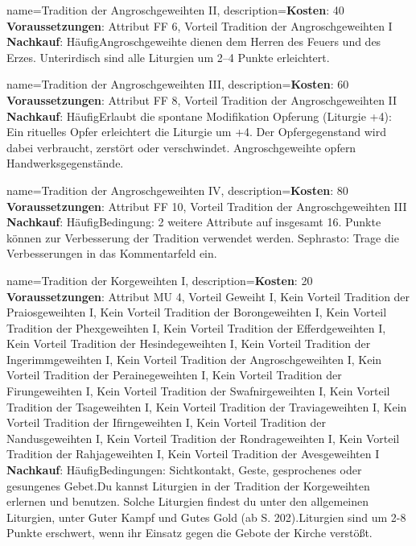 {
    name={Tradition der Angroschgeweihten II},
    description={\textbf{Kosten}: 40 \textbf{Voraussetzungen}: Attribut FF 6, Vorteil Tradition der Angroschgeweihten I \textbf{Nachkauf}: Häufig\newline Angroschgeweihte dienen dem Herren des Feuers und des Erzes. Unterirdisch sind alle Liturgien um 2–4 Punkte erleichtert.}
}


{
    name={Tradition der Angroschgeweihten III},
    description={\textbf{Kosten}: 60 \textbf{Voraussetzungen}: Attribut FF 8, Vorteil Tradition der Angroschgeweihten II \textbf{Nachkauf}: Häufig\newline Erlaubt die spontane Modifikation Opferung (Liturgie +4): Ein rituelles Opfer erleichtert die Liturgie um +4. Der Opfergegenstand wird dabei verbraucht, zerstört oder verschwindet. Angroschgeweihte opfern Handwerksgegenstände.}
}


{
    name={Tradition der Angroschgeweihten IV},
    description={\textbf{Kosten}: 80 \textbf{Voraussetzungen}: Attribut FF 10, Vorteil Tradition der Angroschgeweihten III \textbf{Nachkauf}: Häufig\newline Bedingung: 2 weitere Attribute auf insgesamt 16. Punkte können zur Verbesserung der Tradition verwendet werden. Sephrasto: Trage die Verbesserungen in das Kommentarfeld ein.}
}


{
    name={Tradition der Korgeweihten I},
    description={\textbf{Kosten}: 20 \textbf{Voraussetzungen}: Attribut MU 4, Vorteil Geweiht I, Kein Vorteil Tradition der Praiosgeweihten I, Kein Vorteil Tradition der Borongeweihten I, Kein Vorteil Tradition der Phexgeweihten I, Kein Vorteil Tradition der Efferdgeweihten I, Kein Vorteil Tradition der Hesindegeweihten I, Kein Vorteil Tradition der Ingerimmgeweihten I, Kein Vorteil Tradition der Angroschgeweihten I, Kein Vorteil Tradition der Perainegeweihten I, Kein Vorteil Tradition der Firungeweihten I, Kein Vorteil Tradition der Swafnirgeweihten I, Kein Vorteil Tradition der Tsageweihten I, Kein Vorteil Tradition der Traviageweihten I, Kein Vorteil Tradition der Ifirngeweihten I, Kein Vorteil Tradition der Nandusgeweihten I, Kein Vorteil Tradition der Rondrageweihten I, Kein Vorteil Tradition der Rahjageweihten I, Kein Vorteil Tradition der Avesgeweihten I \textbf{Nachkauf}: Häufig\newline Bedingungen: Sichtkontakt, Geste, gesprochenes oder gesungenes Gebet.\newline Du kannst Liturgien in der Tradition der Korgeweihten erlernen und benutzen. Solche Liturgien findest du unter den allgemeinen Liturgien, unter Guter Kampf und Gutes Gold (ab S. 202).\newline Liturgien sind um 2-8 Punkte erschwert, wenn ihr Einsatz gegen die Gebote der Kirche verstößt.}
}


